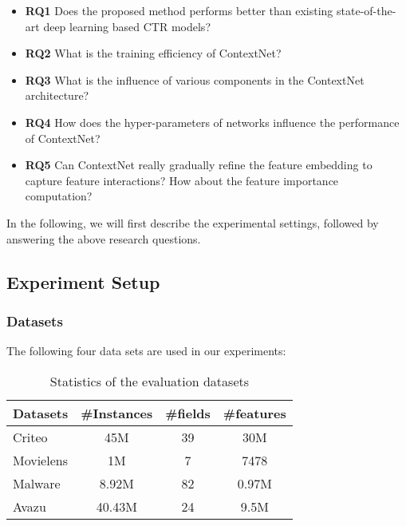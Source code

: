 \documentclass[sigconf]{acmart}
\begin{document}
\begin{itemize}
\item\noindent\textbf{RQ1} Does the proposed method performs better than existing state-of-the-art  deep learning based CTR models?

\item\noindent\textbf{RQ2} What is the training efficiency of ContextNet?

\item\noindent\textbf{RQ3} What is the influence of various components in the ContextNet architecture?

\item\noindent\textbf{RQ4} How does the hyper-parameters of networks influence the performance of ContextNet?

\item\noindent\textbf{RQ5} Can ContextNet really gradually refine the feature embedding to capture feature interactions? How about the feature importance computation?
\end{itemize}


In the following, we will first describe the experimental settings, followed by answering the above research questions.



\subsection{Experiment Setup}

\subsubsection{Datasets}

The following four data sets are used in our experiments:

\begin{table}
\centering
\caption{Statistics of the evaluation datasets}
\begin{tabular}{lccc}
\toprule
Datasets  & \#Instances & \#fields & \#features \\
\midrule
Criteo       & 45M  & 39 & 30M     \\
Movielens & 1M & 7 & 7478 \\
Malware     & 8.92M  & 82 & 0.97M \\
Avazu       & 40.43M  & 24 & 9.5M     \\
\bottomrule
\end{tabular}
\label{tab:datasets}
\end{table}
\end{document}

